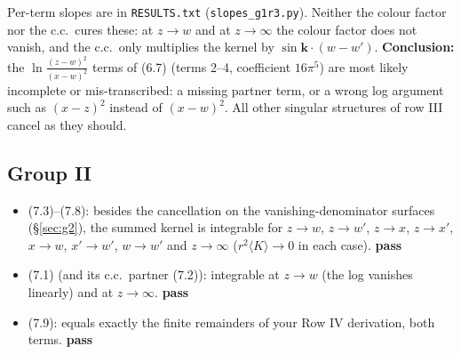 \documentclass[10pt]{article}
\newcommand{\ok}{\textcolor{green!45!black}{\textbf{pass}}}
\begin{document}
Per-term slopes are in \texttt{RESULTS.txt} (\texttt{slopes\_g1r3.py}). Neither the colour factor nor the c.c.\ cures these: at $z\to w$ and at $z\to\infty$
the colour factor does not vanish, and the c.c.\ only multiplies the kernel by $\sin\mathbf k\cdot(w-w')$. \textbf{Conclusion:} the
$\ln\frac{(z-w)^2}{(x-w)^2}$ terms of (6.7) (terms 2--4, coefficient $16\pi^5$) are most likely incomplete or mis-transcribed: a missing partner term, or a wrong
log argument such as $(x-z)^2$ instead of $(x-w)^2$. All other singular structures of row III cancel as they should.

\subsection{Group II}
\begin{itemize}
\item (7.3)--(7.8): besides the cancellation on the vanishing-denominator surfaces (\S\ref{sec:g2}), the summed kernel is integrable for $z\to w$, $z\to w'$,
$z\to x$, $z\to x'$, $x\to w$, $x'\to w'$, $w\to w'$ and $z\to\infty$ ($r^2\langle K\rangle\to0$ in each case). \ok
\item (7.1) (and its c.c.\ partner (7.2)): integrable at $z\to w$ (the log vanishes linearly) and at $z\to\infty$. \ok
\item (7.9): equals exactly the finite remainders of your Row IV derivation, both terms. \ok
\end{itemize}
\end{document}
